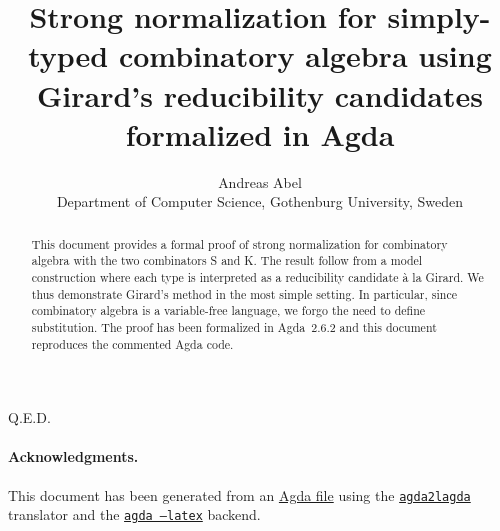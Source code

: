 \documentclass[a4paper]{scrartcl}
\title{Strong normalization for simply-typed combinatory algebra
using Girard's reducibility candidates formalized in Agda}
\author{Andreas Abel
  \\ Department of Computer Science,
    Gothenburg University,
    Sweden
  }
\begin{document}
\maketitle

\begin{abstract}
  This document provides a formal proof of strong normalization for
  combinatory algebra with the two combinators S and K.  The result
  follow from a model construction where each type is interpreted as a
  reducibility candidate à la Girard.  We thus demonstrate Girard's
  method in the most simple setting.  In particular, since combinatory
  algebra is a variable-free language, we forgo the need to define
  substitution.  The proof has been formalized in Agda~2.6.2 and this
  document reproduces the commented Agda code.
\end{abstract}



Q.E.D.

\paragraph*{Acknowledgments.}
This document has been generated from an
\href{https://github.com/andreasabel/truthtable/blob/master/agda/SK-no-bot.agda
    }{Agda file}
using the
\href{https://andreasabel.github.io/agda2lagda/}{\texttt{agda2lagda}}
translator and the \href{http://agda-lang.org}{\texttt{agda --latex}} backend.



% 





% 

\end{document}
